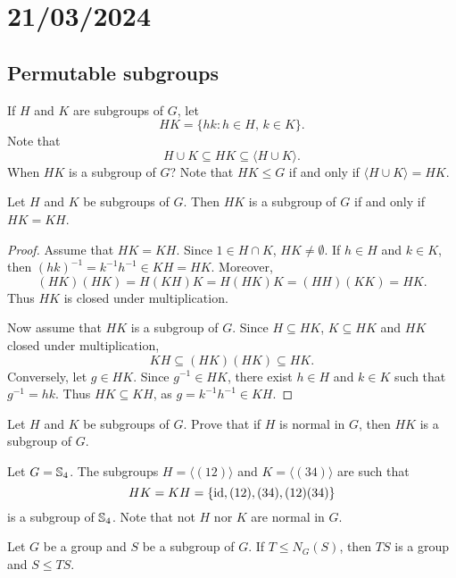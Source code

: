 \section{21/03/2024}

\subsection{Permutable subgroups}

If $H$ and $K$ are subgroups of $G$, let 
\[
        HK=\{hk:h\in H,\,k\in K\}.
\]
Note that 
\[
H\cup K\subseteq HK\subseteq\langle H\cup K\rangle.
\]
When $HK$ is a subgroup of $G$? 
Note that $HK\leq G$ if and only if $\langle H\cup K\rangle=HK$.

\begin{proposition}
        Let $H$ and $K$ be subgroups of $G$. Then $HK$ is a subgroup of
        $G$ if and only if $HK=KH$.
\end{proposition}

\begin{proof}
    Assume that $HK=KH$. Since $1\in H\cap K$, $HK\ne\emptyset$. 
    If $h\in H$ and $k\in K$, then $(hk)^{-1}=k^{-1}h^{-1}\in KH=HK$. Moreover, 
    \[
    (HK)(HK)=H(KH)K=H(HK)K=(HH)(KK)=HK.
    \]
    Thus $HK$ is closed under multiplication. 

    Now assume that $HK$ is a subgroup of $G$. Since $H\subseteq HK$,
    $K\subseteq HK$ and $HK$ closed under multiplication,
        \[
        KH\subseteq (HK)(HK)\subseteq HK.
        \]
        Conversely, let $g\in HK$.
        Since $g^{-1}\in HK$, there exist $h\in H$ and $k\in K$ such that
        $g^{-1}=hk$.
        Thus $HK\subseteq KH$, as 
        $g=k^{-1}h^{-1}\in KH$.
\end{proof}

\begin{exercise}
\label{xca:HK_normal}
Let $H$ and $K$ be subgroups of $G$. Prove that 
if $H$ is normal in $G$, then $HK$ is a subgroup of $G$.
\end{exercise}

\begin{example}
Let $G=\mathbb{S}_4$. The subgroups $H=\langle (12)\rangle$ and $K=\langle (34)\rangle$ are such that 
\[
HK=KH=\{
\operatorname{id},(12),(34),(12)(34)\}
\]
is a subgroup of 
$\mathbb{S}_4$. Note that not $H$ nor $K$
are normal in $G$.
\end{example}

\begin{exercise}
Let $G$ be a group and $S$ be a subgroup of $G$. 
If $T\leq N_G(S)$, then $TS$ is a group and $S\leq TS$.
\end{exercise}

